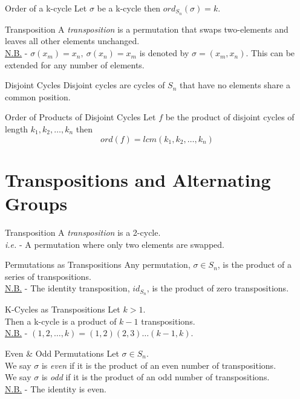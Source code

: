 \documentclass[11pt,a4paper]{article}
\begin{document}
\subtitle{Theorem 13.04 - }{Order of a k-cycle}
Let $\sigma$ be a k-cycle then $ord_{S_n}(\sigma) = k$.\\

\subtitle{Definition 13.05 - }{Transposition}
A \textit{transposition} is a permutation that swaps two-elements and leaves all other elements unchanged.\\
\underline{N.B.} - $\sigma(x_m) = x_n,\ \sigma(x_n) = x_m$ is denoted by $\sigma = (x_m, x_n)$. This can be extended for any number of elements.\\

\subtitle{Definition 13.06 - }{Disjoint Cycles}
Disjoint cycles are cycles of $S_n$ that have no elements share a common position.\\

\subtitle{Theorem 13.07 - }{Order of Products of Disjoint Cycles}
Let $f$ be the product of disjoint cycles of length $k_1, k_2, \dots , k_n$ then
$$ord(f) = lcm(k_1, k_2, \dots , k_n)$$

\section{Transpositions and Alternating Groups}

\subtitle{Definition 14.01 - }{Transposition}
A \textit{transposition} is a 2-cycle.\\
\textit{i.e.} - A permutation where only two elements are swapped.\\

\subtitle{Theorem 14.02 - }{Permutations as Transpositions}
Any permutation, $\sigma \in S_n$, is the product of a series of transpositions.\\
\underline{N.B.} - The identity transposition, $id_{S_n}$, is the product of zero transpositions.\\

\subtitle{Proposition 14.03 - }{K-Cycles as Transpositions}
Let $k > 1$.\\
Then a k-cycle is a product of $k-1$ transpositions.\\
\underline{N.B.} - $(1, 2, \dots , k) = (1,2)(2,3) \dots (k-1, k)$.\\

\subtitle{Definition 14.04 - }{Even \& Odd Permutations}
Let $\sigma \in S_n$.\\
We say $\sigma$ is \textit{even} if it is the product of an even number of transpositions.\\
We say $\sigma$ is \textit{odd} if it is the product of an odd number of transpositions.\\
\underline{N.B.} - The identity is even.\\
\end{document}

